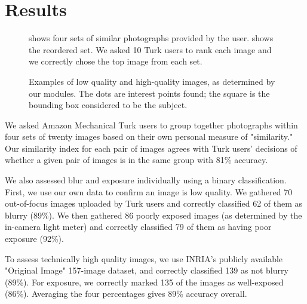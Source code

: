 \documentclass{sig-alternate}
\begin{document}
\section{Results}

\begin{figure*}[t!]
\centering
{}
\caption{ shows four sets of similar photographs provided by the user.  shows the reordered set. We asked 10 Turk users to rank each image and we correctly chose the top image from each set.}
\label{fig:ResultSorting}
\end{figure*}

\begin{figure*}[t!]
\centering
{}
\caption{Examples of  low quality and  high-quality images, as determined by our modules. The dots are interest points found; the square is the bounding box considered to be the subject.}
\label{fig:Examples}
\end{figure*}

We asked Amazon Mechanical Turk users to group together photographs within four sets of twenty images based on their own personal measure of "similarity." Our similarity index for each pair of images agrees with Turk users' decisions of whether a given pair of images is in the same group with 81\% accuracy.

We also assessed blur and exposure individually using a binary classification. First, we use our own data to confirm an image is low quality. We gathered 70 out-of-focus images uploaded by Turk users and correctly classified 62 of them as blurry (89\%). We then gathered 86 poorly exposed images (as determined by the in-camera light meter) and correctly classified 79 of them as having poor exposure (92\%).

To assess technically high quality images, we use INRIA's publicly available "Original Image" 157-image dataset\cite{JDS08}, and correctly classified 139 as not blurry (89\%). For exposure, we correctly marked 135 of the images as well-exposed (86\%). Averaging the four percentages gives 89\% accuracy overall.
\end{document}

